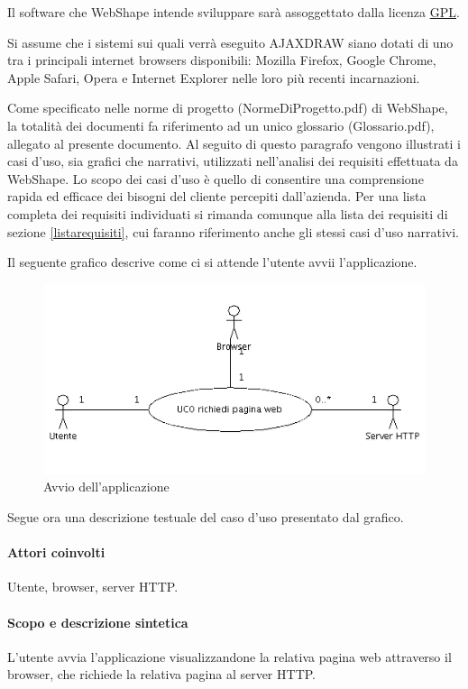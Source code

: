 Il software che WebShape intende sviluppare sar\`a assoggettato dalla licenza \underline{GPL}.

Si assume che i sistemi sui quali verr\`a eseguito AJAXDRAW siano dotati di uno tra i principali internet browsers disponibili: Mozilla Firefox, Google Chrome, Apple Safari, Opera e Internet Explorer nelle loro pi\`u recenti incarnazioni.

Come specificato nelle norme di progetto (NormeDiProgetto.pdf) di WebShape, la totalit\` a dei documenti fa riferimento ad un unico glossario (Glossario.pdf), allegato al presente documento.
\newpage
{}
Al seguito di questo paragrafo vengono illustrati i casi d'uso, sia grafici che narrativi, utilizzati nell'analisi dei requisiti effettuata da WebShape. Lo scopo dei casi d'uso \`e quello di consentire una comprensione rapida ed efficace dei bisogni del cliente percepiti dall'azienda. Per una lista completa dei requisiti individuati si rimanda comunque alla lista dei requisiti di sezione \ref{listarequisiti}, cui faranno riferimento anche gli stessi casi d'uso narrativi.

Il seguente grafico descrive come ci si attende l'utente avvii l'applicazione.
\begin{figure}[!ht]
\centering
\includegraphics{UCAvvio.png}
\caption{Avvio dell'applicazione}
\end{figure}

Segue ora una descrizione testuale del caso d'uso presentato dal grafico.

\paragraph{Attori coinvolti} Utente, browser, server HTTP.
\paragraph{Scopo e descrizione sintetica}
L'utente avvia l'applicazione visualizzandone la relativa pagina web attraverso il browser, che richiede la relativa pagina al server HTTP.
